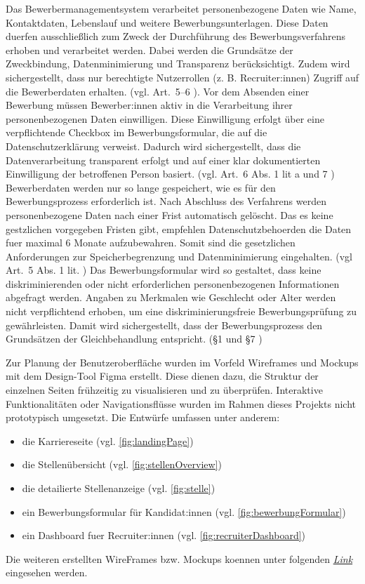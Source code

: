 Das Bewerbermanagementsystem verarbeitet personenbezogene Daten wie Name, Kontaktdaten, Lebenslauf und weitere Bewerbungsunterlagen. 
Diese Daten duerfen ausschließlich zum Zweck der Durchführung des Bewerbungsverfahrens erhoben und verarbeitet werden. 
Dabei werden die Grundsätze der Zweckbindung, Datenminimierung und Transparenz berücksichtigt. 
Zudem wird sichergestellt, dass nur berechtigte Nutzerrollen (z. B. Recruiter:innen) Zugriff auf die Bewerberdaten erhalten. (vgl. Art.~5–6 \parencite{dsgvo}).
\newline
Vor dem Absenden einer Bewerbung müssen Bewerber:innen aktiv in die Verarbeitung ihrer personenbezogenen Daten einwilligen. 
Diese Einwilligung erfolgt über eine verpflichtende Checkbox im Bewerbungsformular, die auf die Datenschutzerklärung verweist. 
Dadurch wird sichergestellt, dass die Datenverarbeitung transparent erfolgt und auf einer klar dokumentierten Einwilligung der betroffenen Person basiert. (vgl. Art.~6 Abs. 1 lit a und 7 \parencite{dsgvo})
\newline
Bewerberdaten werden nur so lange gespeichert, wie es für den Bewerbungsprozess erforderlich ist. 
Nach Abschluss des Verfahrens werden personenbezogene Daten nach einer Frist automatisch gelöscht. 
Das es keine gestzlichen vorgegeben Fristen gibt, empfehlen Datenschutzbehoerden die Daten fuer maximal 6 Monate aufzubewahren. 
Somit sind die gesetzlichen Anforderungen zur Speicherbegrenzung und Datenminimierung eingehalten. (vgl Art.~5 Abs. 1 lit. \parencite{dsgvo})
\newline
Das Bewerbungsformular wird so gestaltet, dass keine diskriminierenden oder nicht erforderlichen personenbezogenen Informationen abgefragt werden. 
Angaben zu Merkmalen wie Geschlecht oder Alter werden nicht verpflichtend erhoben, um eine diskriminierungsfreie Bewerbungsprüfung zu gewährleisten. 
Damit wird sichergestellt, dass der Bewerbungsprozess den Grundsätzen der Gleichbehandlung entspricht. (§1 und §7 \parencite{agg})

Zur Planung der Benutzeroberfläche wurden im Vorfeld Wireframes und Mockups mit dem Design-Tool Figma erstellt. 
Diese dienen dazu, die Struktur der einzelnen Seiten frühzeitig zu visualisieren und zu überprüfen. 
Interaktive Funktionalitäten oder Navigationsflüsse wurden im Rahmen dieses Projekts nicht prototypisch umgesetzt. 
Die Entwürfe umfassen unter anderem:
\begin{itemize}
	\item die Karriereseite (vgl. \ref{fig:landingPage})
	\item die Stellenübersicht (vgl. \ref{fig:stellenOverview})
	\item die detailierte Stellenanzeige (vgl. \ref{fig:stelle})
	\item ein Bewerbungsformular für Kandidat:innen (vgl. \ref{fig:bewerbungFormular})
	\item ein Dashboard fuer Recruiter:innen (vgl. \ref{fig:recruiterDashboard})
\end{itemize}
Die weiteren erstellten WireFrames bzw. Mockups koennen unter folgenden 
\href{https://www.figma.com/design/0LDsbppkYlQgEbpulk5ud9/ATS-WebApp?node-id=20-46&t=cHVE2zw3fKD8hl14}{\textit{Link}} eingesehen werden.

